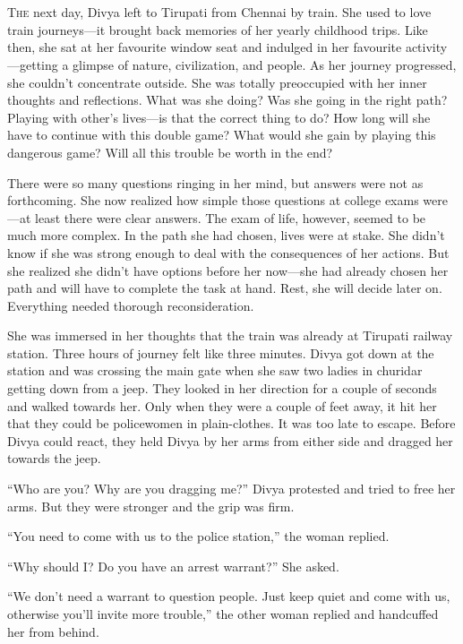 \chapter{}

\lettrine{T}{he} next day, Divya left to Tirupati from Chennai by train. She used to love
train journeys—it brought back memories of her yearly childhood trips. Like
then, she sat at her favourite window seat and indulged in her favourite
activity—getting a glimpse of nature, civilization, and people. As her journey
progressed, she couldn't concentrate outside. She was totally preoccupied with
her inner thoughts and reflections. What was she doing? Was she going in the
right path? Playing with other's lives—is that the correct thing to do? How
long will she have to continue with this double game? What would she gain by
playing this dangerous game? Will all this trouble be worth in the end?

There were so many questions ringing in her mind, but answers were not as
forthcoming. She now realized how simple those questions at college exams
were—at least there were clear answers. The exam of life, however, seemed to be
much more complex. In the path she had chosen, lives were at stake. She didn't know
if she was strong enough to deal with the consequences of her actions. But she
realized she didn't have options before her now—she had already chosen her
path and will have to complete the task at hand. Rest, she will decide later on.
Everything needed thorough reconsideration.

She was immersed in her thoughts that the train was already at Tirupati railway
station. Three hours of journey felt like three minutes. Divya got down at the
station and was crossing the main gate when she saw two ladies in churidar
getting down from a jeep. They looked in her direction for a couple of seconds
and walked towards her. Only when they were a couple of feet away, it hit her
that they could be policewomen in plain-clothes. It was too late to escape.
Before Divya could react, they held Divya by her arms from either side and
dragged her towards the jeep.

“Who are you? Why are you dragging me?” Divya protested and tried to free her
arms. But they were stronger and the grip was firm.

“You need to come with us to the police station,” the woman replied.

“Why should I? Do you have an arrest warrant?” She asked.

“We don't need a warrant to question people. Just keep quiet and come with us,
otherwise you'll invite more trouble,” the other woman replied and handcuffed
her from behind.

